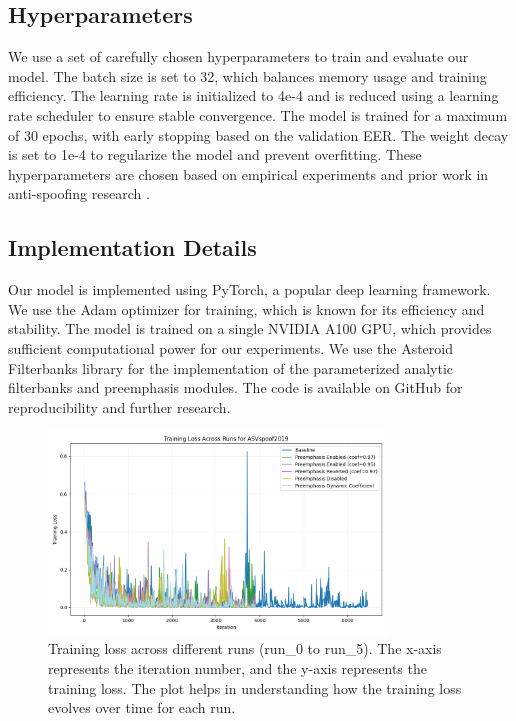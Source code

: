 \documentclass{article} %
\begin{document}
\subsection{Hyperparameters}
\label{subsec:hyperparameters}
We use a set of carefully chosen hyperparameters to train and evaluate our model. The batch size is set to 32, which balances memory usage and training efficiency. The learning rate is initialized to 4e-4 and is reduced using a learning rate scheduler to ensure stable convergence. The model is trained for a maximum of 30 epochs, with early stopping based on the validation EER. The weight decay is set to 1e-4 to regularize the model and prevent overfitting. These hyperparameters are chosen based on empirical experiments and prior work in anti-spoofing research \citep{asvspoof2019}.

\subsection{Implementation Details}
\label{subsec:implementation_details}
Our model is implemented using PyTorch, a popular deep learning framework. We use the Adam optimizer \citep{kingma2014adam} for training, which is known for its efficiency and stability. The model is trained on a single NVIDIA A100 GPU, which provides sufficient computational power for our experiments. We use the Asteroid Filterbanks library \citep{asteroid} for the implementation of the parameterized analytic filterbanks and preemphasis modules. The code is available on GitHub for reproducibility and further research.

\begin{figure}[h]
    \centering
    \includegraphics[width=0.8\textwidth]{train_loss_ASVspoof2019_across_runs.png}
    \caption{Training loss across different runs (run\_0 to run\_5). The x-axis represents the iteration number, and the y-axis represents the training loss. The plot helps in understanding how the training loss evolves over time for each run.}
    \label{fig:train_loss}
\end{figure}
\end{document}
